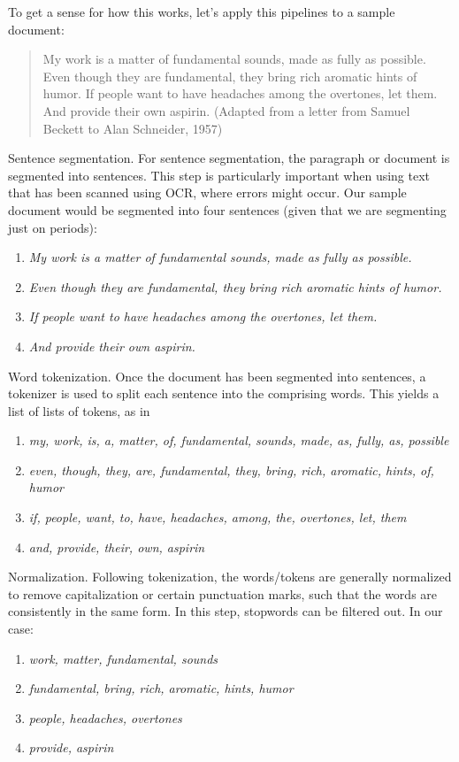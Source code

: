 To get a sense for how this works, let's apply this pipelines to a sample document:

\begin{quote}
My work is a matter of fundamental sounds, made as fully as possible. Even though they are fundamental, they bring rich aromatic hints of humor. If people want to have headaches among the overtones, let them. And provide their own aspirin. (Adapted from a letter from Samuel Beckett to Alan Schneider, 1957)
\end{quote}

Sentence segmentation.  For sentence segmentation, the paragraph or document is segmented into sentences. This step is particularly important when using text that has been scanned using OCR, where errors might occur. Our sample document would be segmented into four sentences (given that we are segmenting just on periods):

\begin{enumerate}
    \item \textit{My work is a matter of fundamental sounds, made as fully as possible.}
    \item \textit{Even though they are fundamental, they bring rich aromatic hints of humor.}
    \item \textit{If people want to have headaches among the overtones, let them.}
    \item \textit{And provide their own aspirin.}
\end{enumerate}

Word tokenization. Once the document has been segmented into sentences, a tokenizer is used to split each sentence into the comprising words. This yields a list of lists of tokens, as in
\begin{enumerate}
    \item \textit{my, work, is, a, matter, of, fundamental, sounds, made, as, fully, as, possible}
    \item \textit{even, though, they, are, fundamental, they, bring, rich, aromatic, hints, of, humor}
    \item \textit{if, people, want, to, have, headaches, among, the, overtones, let, them}
    \item \textit{and, provide, their, own, aspirin}
\end{enumerate}

Normalization. Following tokenization, the words/tokens are generally normalized to remove capitalization or certain punctuation marks, such that the words are consistently in the same form. In this step, stopwords can be filtered out. In our case:
\begin{enumerate}
    \item \textit{work, matter, fundamental, sounds}
    \item \textit{fundamental, bring, rich, aromatic, hints, humor}
    \item \textit{people, headaches, overtones}
    \item \textit{provide, aspirin}
\end{enumerate}

